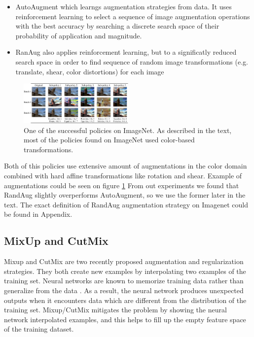 \begin{itemize}
    \item AutoAugment \cite{cubuk2018_autoaugment} which learngs augmentation strategies from data. It uses reinforcement learning to select a sequence of image augmentation operations with the best accuracy by searching a discrete search space of their probability of application and magnitude.
    \item RanAug \cite{cubuk2020_randaugment} also applies reinforcement learning, but to a significatly reduced search space in order to find sequence of random image transformations (e.g. translate, shear, color distortions) for each image
\end{itemize}

\begin{figure}[h!]
    \caption{One of the successful policies on ImageNet. As described in the text, most of the policies found on ImageNet used color-based transformations.}
    \label{fig: randaug}
    \includegraphics[width=0.5\textwidth]{images/randaug_policy.png}
  \end{figure}

Both of this policies use extensive amount of augmentations in the color domain combined with hard affine transformations like rotation and shear. Example of augmentations could be seen on figure \ref{fig: randaug}
From out experiments we found that RandAug slightly overperforms AutoAugment, so we use the former later in the text. The exact definition of RandAug augmentation strategy on Imagenet could be found in Appendix. 


\subsection{MixUp and CutMix}


Mixup \cite{zhang2017_mixup} and CutMix \cite{yun2019_cutmix} are two recently proposed augmentation and regularization strategies. They both create new examples by interpolating two examples of the training set. Neural networks are known to memorize training data rather than generalize from the data \cite{zhang2016_understanding_deep}. As a result, the neural network produces unexpected outputs when it encounters data which are different from the distribution of the training set. Mixup/CutMix mitigates the problem by showing the neural network interpolated examples, and this helps to fill up the empty feature space of the training dataset.


